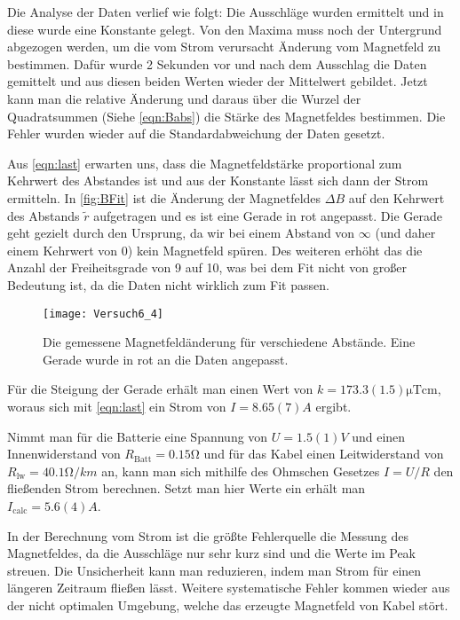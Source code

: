 Die Analyse der Daten verlief wie folgt: Die Ausschläge wurden ermittelt und in diese wurde eine Konstante gelegt.	Von den Maxima muss noch der Untergrund abgezogen werden, um die vom Strom verursacht Änderung vom Magnetfeld zu bestimmen. Dafür wurde 2 Sekunden vor und nach dem Ausschlag die Daten gemittelt und aus diesen beiden Werten wieder der Mittelwert gebildet. Jetzt kann man die relative Änderung und daraus über die Wurzel der Quadratsummen (Siehe \autoref{eqn:Babs}) die Stärke des Magnetfeldes bestimmen. Die Fehler wurden wieder auf die Standardabweichung der Daten gesetzt.

Aus \autoref{eqn:last} erwarten uns, dass die Magnetfeldstärke proportional zum Kehrwert des Abstandes ist und aus der Konstante lässt sich dann der Strom ermitteln. In \autoref{fig:BFit} ist die Änderung der Magnetfeldes \( \Delta B \) auf den Kehrwert des Abstands \( \tilde{r} \) aufgetragen und es ist eine Gerade in rot angepasst. Die Gerade geht gezielt durch den Ursprung, da wir bei einem Abstand von \( \infty \) (und daher einem Kehrwert von 0) kein Magnetfeld spüren. Des weiteren erhöht das die Anzahl der Freiheitsgrade von 9 auf 10, was bei dem Fit nicht von großer Bedeutung ist, da die Daten nicht wirklich zum Fit passen. 

\begin{figure}[H]	
	\centering
	\texttt{[image: Versuch6\_4]}
	\caption{Die gemessene Magnetfeldänderung für verschiedene Abstände. Eine Gerade wurde in rot an die Daten angepasst.}
	\label{fig:BFit}
\end{figure}

Für die Steigung der Gerade erhält man einen Wert von \( k = 173.3(1.5) \unit{\micro\tesla\cm} \), woraus sich mit \autoref{eqn:last} ein Strom von \( I = 8.65(7) \unit{A} \) ergibt.

Nimmt man für die Batterie eine Spannung von \( U = 1.5(1) \unit{V} \) und einen Innenwiderstand von \( R_{\text{Batt}} = 0.15 \unit{\ohm} \) und für das Kabel einen Leitwiderstand von \( R_{\text{lw}} = 40.1 \unit{\ohm/km} \) an, kann man sich mithilfe des Ohmschen Gesetzes \( I = U/R \) den fließenden Strom berechnen. Setzt man hier Werte ein erhält man \( I_{\text{calc}} = 5.6(4) \unit{A} \).

In der Berechnung vom Strom ist die größte Fehlerquelle die Messung des Magnetfeldes, da die Ausschläge nur sehr kurz sind und die Werte im Peak streuen. Die Unsicherheit kann man reduzieren, indem man Strom für einen längeren Zeitraum fließen lässt. Weitere systematische Fehler kommen wieder aus der nicht optimalen Umgebung, welche das erzeugte Magnetfeld von Kabel stört. 